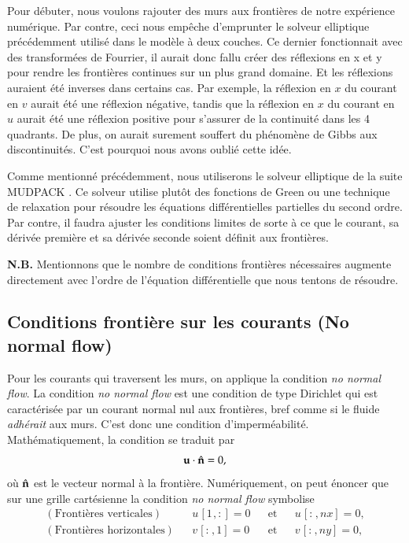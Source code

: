 \documentclass[10pt]{article}
\numberwithin{equation}{section}
\newcommand{\nvf}{\hat{\vb{n}}}
\newcommand{\pt}{\hspace{1pt}}
\begin{document}
Pour débuter, nous voulons rajouter des murs aux frontières de notre expérience numérique.
Par contre, ceci nous empêche d'emprunter le solveur elliptique précédemment utilisé dans le modèle à deux couches.
Ce dernier fonctionnait avec des transformées de Fourrier, il aurait donc fallu créer des réflexions en x et y pour rendre les frontières continues sur un plus grand domaine.
Et les réflexions auraient été inverses dans certains cas.
Par exemple, la réflexion en \(x\) du courant en \(v\) aurait été une réflexion négative, tandis que la réflexion en \(x\) du courant en \(u\) aurait été une réflexion positive pour s'assurer de la continuité dans les 4 quadrants.
De plus, on aurait surement souffert du phénomène de Gibbs aux discontinuités.
C'est pourquoi nous avons oublié cette idée.\bigskip

Comme mentionné précédemment, nous utiliserons le solveur elliptique de la suite MUDPACK \citep{adams1989mudpack}.
Ce solveur utilise plutôt des fonctions de Green ou une technique de relaxation pour résoudre les équations différentielles partielles du second ordre.
Par contre, il faudra ajuster les conditions limites de sorte à ce que le courant, sa dérivée première et sa dérivée seconde soient définit aux frontières.\bigskip

\textbf{N.B.} Mentionnons que le nombre de conditions frontières nécessaires augmente directement avec l'ordre de l'équation différentielle que nous tentons de résoudre.

\subsection{Conditions frontière sur les courants (No normal flow)}
\label{sec:orgd973dd1}
Pour les courants qui traversent les murs, on applique la condition \emph{no normal flow}.
La condition \emph{no normal flow} est une condition de type Dirichlet qui est caractérisée par un courant normal nul aux frontières, bref comme si le fluide \emph{adhérait} aux murs.
C'est donc une condition d'imperméabilité.
Mathématiquement, la condition se traduit par
\begin{equation}
\vb{u} \cdot \nvf =0,
\end{equation}
où \(\nvf\) est le vecteur normal à la frontière.
Numériquement, on peut énoncer que sur une grille cartésienne la condition \emph{no normal flow} symbolise
\begin{subequations}
\begin{align}
  &&(\text{Frontières verticales}) && u\pt[1\pt,:] = 0 && \text{et} && u\pt[:\pt,nx] = 0,&& \\
  &&(\text{Frontières horizontales}) && v\pt[:\pt,1] = 0 && \text{et} && v\pt[:\pt,ny] = 0,&&  
\end{align}
\end{subequations}
\end{document}
